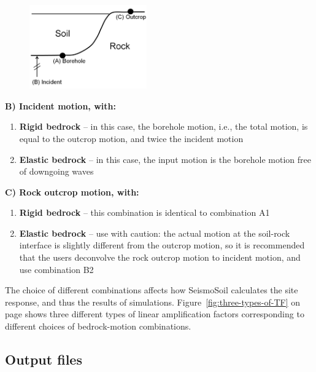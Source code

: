 \documentclass[11pt,letterpaper]{article}
\begin{document}
\begin{figure}
\begin{center}
  \includegraphics[width=0.45\textwidth]{three_motion_types.png}\\
\end{center}
\end{figure}

\noindent\textbf{B) Incident motion, with:}
\vspace{-10pt}
\begin{enumerate}
\item \textbf{Rigid bedrock} -- in this case, the borehole motion, i.e., the total motion, is equal to the outcrop motion, and twice the incident motion
\item \textbf{Elastic bedrock} -- in this case, the input motion is the borehole motion free of downgoing waves
\end{enumerate}

\noindent\textbf{C) Rock outcrop motion, with:}
\vspace{-10pt}
\begin{enumerate}
\item \textbf{Rigid bedrock} -- this combination is identical to combination A1
\item \textbf{Elastic bedrock} -- use with caution: the actual motion at the soil-rock interface is slightly different from the outcrop motion, so it is recommended that the users deconvolve the rock outcrop motion to incident motion, and use combination B2
\end{enumerate}

The choice of different combinations affects how SeismoSoil calculates the site response, and thus the results of simulations. Figure~\ref{fig:three-types-of-TF} on page \pageref{fig:three-types-of-TF} shows three different types of linear amplification factors corresponding to different choices of bedrock-motion combinations.


\newpage
\subsection{Output files}
\end{document}
